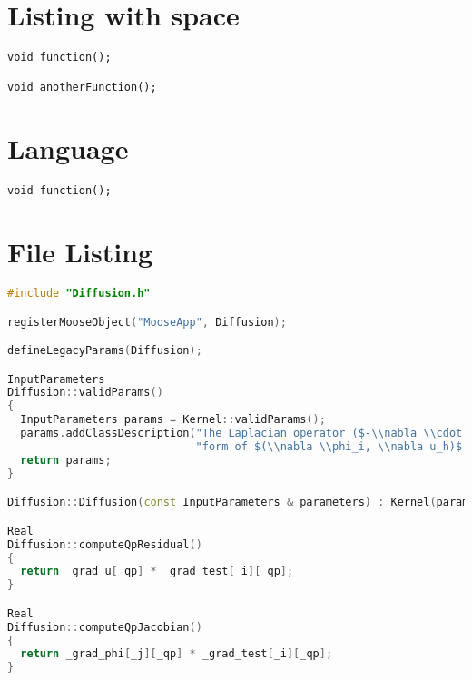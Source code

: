 \section{\label{listing-with-space}Listing with space}
\begin{verbatim}
void function();

void anotherFunction();
\end{verbatim}

\section{\label{language}Language}
\begin{verbatim}
void function();
\end{verbatim}

\section{\label{file-listing}File Listing}
\begin{lstlisting}[language=C++,label=diffusion-c,caption=\mbox{}]
#include "Diffusion.h"

registerMooseObject("MooseApp", Diffusion);

defineLegacyParams(Diffusion);

InputParameters
Diffusion::validParams()
{
  InputParameters params = Kernel::validParams();
  params.addClassDescription("The Laplacian operator ($-\\nabla \\cdot \\nabla u$), with the weak "
                             "form of $(\\nabla \\phi_i, \\nabla u_h)$.");
  return params;
}

Diffusion::Diffusion(const InputParameters & parameters) : Kernel(parameters) {}

Real
Diffusion::computeQpResidual()
{
  return _grad_u[_qp] * _grad_test[_i][_qp];
}

Real
Diffusion::computeQpJacobian()
{
  return _grad_phi[_j][_qp] * _grad_test[_i][_qp];
}
\end{lstlisting}

